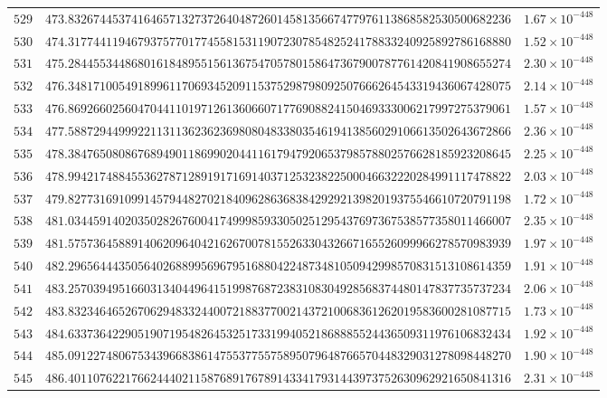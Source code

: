 \documentclass[12pt,reqno]{amsart}
\theoremstyle{remark}
\begin{document}
\begin{longtable}{clc}
$529$ & $473.8326744537416465713273726404872601458135667477976113868582530500682236$ & $1.67\times 10^{-448}$ \\
$530$ & $474.3177441194679375770177455815311907230785482524178833240925892786168880$ & $1.52\times 10^{-448}$ \\
$531$ & $475.2844553448680161848955156136754705780158647367900787761420841908655274$ & $2.30\times 10^{-448}$ \\
$532$ & $476.3481710054918996117069345209115375298798092507666264543319436067428075$ & $2.14\times 10^{-448}$ \\
$533$ & $476.8692660256047044110197126136066071776908824150469333006217997275379061$ & $1.57\times 10^{-448}$ \\
$534$ & $477.5887294499922113113623623698080483380354619413856029106613502643672866$ & $2.36\times 10^{-448}$ \\
$535$ & $478.3847650808676894901186990204411617947920653798578802576628185923208645$ & $2.25\times 10^{-448}$ \\
$536$ & $478.9942174884553627871289191716914037125323822500046632220284991117478822$ & $2.03\times 10^{-448}$ \\
$537$ & $479.8277316910991457944827021840962863683842929213982019375546610720791198$ & $1.72\times 10^{-448}$ \\
$538$ & $481.0344591402035028267600417499985933050251295437697367538577358011466007$ & $2.35\times 10^{-448}$ \\
$539$ & $481.5757364588914062096404216267007815526330432667165526099966278570983939$ & $1.97\times 10^{-448}$ \\
$540$ & $482.2965644435056402688995696795168804224873481050942998570831513108614359$ & $1.91\times 10^{-448}$ \\
$541$ & $483.2570394951660313404496415199876872383108304928568374480147837735737234$ & $2.06\times 10^{-448}$ \\
$542$ & $483.8323464652670629483324400721883770021437210068361262019583600281087715$ & $1.73\times 10^{-448}$ \\
$543$ & $484.6337364229051907195482645325173319940521868885524436509311976106832434$ & $1.92\times 10^{-448}$ \\
$544$ & $485.0912274806753439668386147553775575895079648766570448329031278098448270$ & $1.90\times 10^{-448}$ \\
$545$ & $486.4011076221766244402115876891767891433417931443973752630962921650841316$ & $2.31\times 10^{-448}$ \\

\end{longtable}
\end{document}
